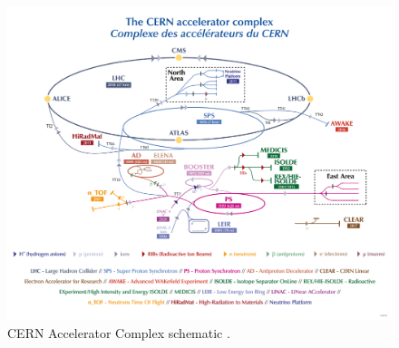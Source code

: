 





\begin{figure}[!h]
    \centering
    \includegraphics[]{figures/lhc_and_atlas/CCC-v2022.png}
    \caption{CERN Accelerator Complex schematic \cite{Lopienska:2800984}. }
    \label{fig:accel_complex}
\end{figure}




